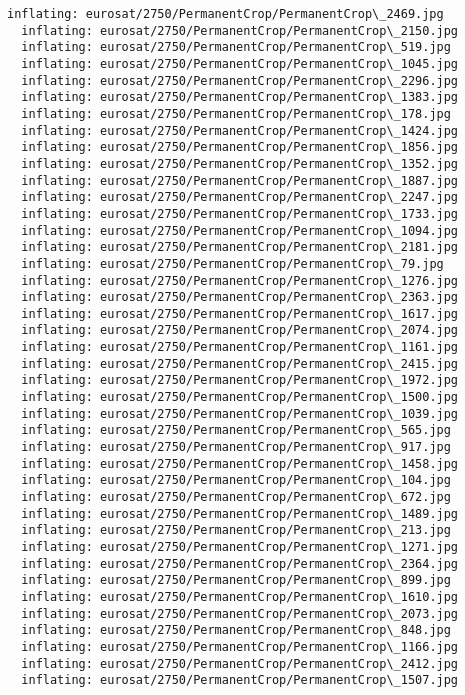 \documentclass[11pt]{article}
\begin{document}
\begin{Verbatim}[commandchars=\\\{\}]
  inflating: eurosat/2750/PermanentCrop/PermanentCrop\_2469.jpg
  inflating: eurosat/2750/PermanentCrop/PermanentCrop\_2150.jpg
  inflating: eurosat/2750/PermanentCrop/PermanentCrop\_519.jpg
  inflating: eurosat/2750/PermanentCrop/PermanentCrop\_1045.jpg
  inflating: eurosat/2750/PermanentCrop/PermanentCrop\_2296.jpg
  inflating: eurosat/2750/PermanentCrop/PermanentCrop\_1383.jpg
  inflating: eurosat/2750/PermanentCrop/PermanentCrop\_178.jpg
  inflating: eurosat/2750/PermanentCrop/PermanentCrop\_1424.jpg
  inflating: eurosat/2750/PermanentCrop/PermanentCrop\_1856.jpg
  inflating: eurosat/2750/PermanentCrop/PermanentCrop\_1352.jpg
  inflating: eurosat/2750/PermanentCrop/PermanentCrop\_1887.jpg
  inflating: eurosat/2750/PermanentCrop/PermanentCrop\_2247.jpg
  inflating: eurosat/2750/PermanentCrop/PermanentCrop\_1733.jpg
  inflating: eurosat/2750/PermanentCrop/PermanentCrop\_1094.jpg
  inflating: eurosat/2750/PermanentCrop/PermanentCrop\_2181.jpg
  inflating: eurosat/2750/PermanentCrop/PermanentCrop\_79.jpg
  inflating: eurosat/2750/PermanentCrop/PermanentCrop\_1276.jpg
  inflating: eurosat/2750/PermanentCrop/PermanentCrop\_2363.jpg
  inflating: eurosat/2750/PermanentCrop/PermanentCrop\_1617.jpg
  inflating: eurosat/2750/PermanentCrop/PermanentCrop\_2074.jpg
  inflating: eurosat/2750/PermanentCrop/PermanentCrop\_1161.jpg
  inflating: eurosat/2750/PermanentCrop/PermanentCrop\_2415.jpg
  inflating: eurosat/2750/PermanentCrop/PermanentCrop\_1972.jpg
  inflating: eurosat/2750/PermanentCrop/PermanentCrop\_1500.jpg
  inflating: eurosat/2750/PermanentCrop/PermanentCrop\_1039.jpg
  inflating: eurosat/2750/PermanentCrop/PermanentCrop\_565.jpg
  inflating: eurosat/2750/PermanentCrop/PermanentCrop\_917.jpg
  inflating: eurosat/2750/PermanentCrop/PermanentCrop\_1458.jpg
  inflating: eurosat/2750/PermanentCrop/PermanentCrop\_104.jpg
  inflating: eurosat/2750/PermanentCrop/PermanentCrop\_672.jpg
  inflating: eurosat/2750/PermanentCrop/PermanentCrop\_1489.jpg
  inflating: eurosat/2750/PermanentCrop/PermanentCrop\_213.jpg
  inflating: eurosat/2750/PermanentCrop/PermanentCrop\_1271.jpg
  inflating: eurosat/2750/PermanentCrop/PermanentCrop\_2364.jpg
  inflating: eurosat/2750/PermanentCrop/PermanentCrop\_899.jpg
  inflating: eurosat/2750/PermanentCrop/PermanentCrop\_1610.jpg
  inflating: eurosat/2750/PermanentCrop/PermanentCrop\_2073.jpg
  inflating: eurosat/2750/PermanentCrop/PermanentCrop\_848.jpg
  inflating: eurosat/2750/PermanentCrop/PermanentCrop\_1166.jpg
  inflating: eurosat/2750/PermanentCrop/PermanentCrop\_2412.jpg
  inflating: eurosat/2750/PermanentCrop/PermanentCrop\_1507.jpg

\end{Verbatim}
\end{document}
